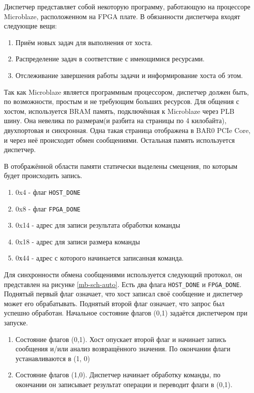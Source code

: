 Диспетчер представляет собой некоторую программу, работающую на процессоре
Microblaze, расположенном на FPGA плате. 
В обязанности диспетчера входят следующие вещи:
\begin{enumerate}
  \item Приём новых задач для выполнения от хоста.
  \item Распределение задач в соответствие с имеющимися ресурсами.
  \item Отслеживание завершения работы задачи и информирование хоста об этом.
\end{enumerate}

Так как Microblaze является программным процессором, диспетчер должен быть,
по возможности, простым и не требующим больших ресурсов.
Для общения с хостом, используется BRAM память, подключённая к Microblaze через
PLB шину. Она невелика по размерам(и разбита на страницы по 4 килобайта),
двухпортовая и синхронная. Одна такая страница отображена в BAR0 PCIe Core,
и через неё происходит обмен сообщениями. Остальная память используется
диспетчер.

В отображённой области памяти статически выделены смещения, по которым будет
происходить запись.
\begin{enumerate}
  \item 0x4 - флаг \texttt {HOST\_DONE}
  \item 0x8 - флаг \texttt {FPGA\_DONE}
  \item 0x14 - адрес для записи результата обработки команды
  \item 0x18 - адрес для записи размера команды
  \item 0х44 - адрес с которого начинается записанная команда.
\end{enumerate}

Для синхронности обмена сообщениями используется следующий протокол, он
представлен на рисунке \ref{mb-sch-auto}. Есть два флага \texttt {HOST\_DONE} и
\texttt {FPGA\_DONE}. Поднятый первый флаг означает, что хост записал своё
сообщение и диспетчер может его обрабатывать. Поднятый второй флаг означает, что
запрос был успешно обработан. Начальное состояние флагов (0,1) задаётся
диспетчером при запуске.
\begin{enumerate}
  \item Состояние флагов (0,1). Хост опускает второй флаг и начинает запись
  сообщения и/или анализ возвращённого значения. По окончании флаги
  устанавливаются в (1, 0)
  \item Состояние флагов (1,0). Диспетчер начинает обработку команды, по
  окончании он записывает результат операции и переводит флаги в (0,1).
\end{enumerate}

